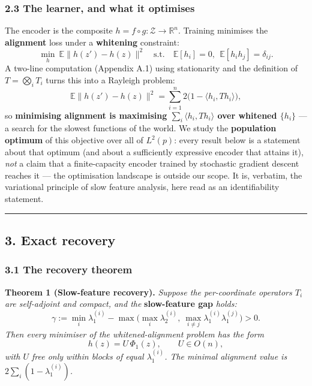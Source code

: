 \documentclass[
  letterpaper,
  11pt]{article}
\theoremstyle{plain}
\theoremstyle{definition}
\theoremstyle{remark}
\begin{document}
\subsubsection{2.3 The learner, and what it optimises}\label{the-learner-and-what-it-optimises}

The encoder is the composite \(h=f\circ g:\mathcal Z\to\mathbb R^n\). Training minimises the \textbf{alignment} loss under a \textbf{whitening} constraint:
\[\min_h\ \mathbb E\big\|h(z')-h(z)\big\|^2 \quad\text{s.t.}\quad \mathbb E[h_i]=0,\ \ \mathbb E[h_i h_j]=\delta_{ij}.\]
A two-line computation (Appendix A.1) using stationarity and the definition of \(T=\bigotimes_i T_i\) turns this into a Rayleigh problem:
\[\mathbb E\|h(z')-h(z)\|^2 = \sum_{i=1}^n 2\big(1-\langle h_i, T h_i\rangle\big),\]
so \textbf{minimising alignment is maximising \(\sum_i\langle h_i, Th_i\rangle\) over whitened \(\{h_i\}\)} --- a search for the slowest functions of the world. We study the \textbf{population optimum} of this objective over all of \(L^2(p)\): every result below is a statement about that optimum (and about a sufficiently expressive encoder that attains it), \emph{not} a claim that a finite-capacity encoder trained by stochastic gradient descent reaches it --- the optimisation landscape is outside our scope. It is, verbatim, the variational principle of slow feature analysis, here read as an identifiability statement.

\begin{center}\rule{0.5\linewidth}{0.5pt}\end{center}

\subsection{3. Exact recovery}\label{sec:exact}

\subsubsection{3.1 The recovery theorem}\label{the-recovery-theorem}

\textbf{Theorem 1 (Slow-feature recovery).} \emph{Suppose the per-coordinate operators \(T_i\) are self-adjoint and compact, and the} \textbf{slow-feature gap} \emph{holds:}
\[\gamma := \min_i \lambda_1^{(i)} - \max\Big(\max_i\lambda_2^{(i)},\ \max_{i\ne j}\lambda_1^{(i)}\lambda_1^{(j)}\Big) > 0. \tag{G}\]
\emph{Then every minimiser of the whitened-alignment problem has the form}
\[h(z) = U\,\Phi_1(z),\qquad U\in O(n),\]
\emph{with \(U\) free only within blocks of equal \(\lambda_1^{(i)}\). The minimal alignment value is \(2\sum_i(1-\lambda_1^{(i)})\).}
\end{document}
